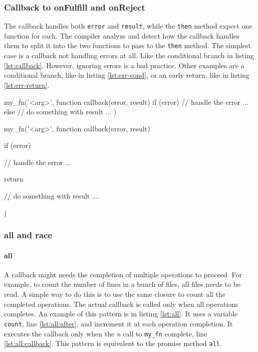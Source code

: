 \subsubsection{Callback to onFulfill and onReject} \label{section:duplication}

The callback handles both \texttt{error} and \texttt{result}, while the \texttt{then} method expect one function for each.
The compiler analyze and detect how the callback handles them to split it into the two functions to pass to the \texttt{then} method.
The simplest case is a callback not handling errors at all.
Like the conditional branch in listing \ref{lst:callback}.
However, ignoring errors is a bad practice.
Other examples are a conditional branch, like in listing \ref{lst:err-cond}, or an early return, like in listing \ref{lst:err-return}.

\begin{code}[js, %
             caption={A conditional switch to handle errors}, %
             label={lst:err-cond}] %
my_fn('<arg>', function callback(error, result) {
  if (error) {
    // handle the error ...
  } else {
    // do something with result ...
  }
})
\end{code}

\begin{code}[js, %
             caption={An early return to handle errors}, %
             label={lst:err-return}] %
my_fn('<arg>', function callback(error, result) {
  if (error) {
    // handle the error ...

    return
  }
  
  // do something with result ...
})
\end{code}

\subsubsection{all and race} \label{section:all-race}

\paragraph{all}

A callback might needs the completion of multiple operations to proceed.
For example, to count the number of lines in a bunch of files, all files needs to be read.
A simple way to do this is to use the same closure to count all the completed operations.
The actual callback is called only when all operations completes.
An example of this pattern is in listing \ref{lst:all}.
It uses a variable \texttt{count}, line \ref{lst:all:after}, and increment it at each operation completion.
It executes the callback only when the \textit{n} call to \texttt{my_fn} complete, line \ref{lst:all:callback}.
This pattern is equivalent to the promise method \texttt{all}.

